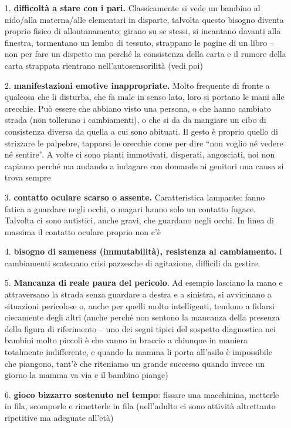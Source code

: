 \begin{itemize}
\item[1.]
  \textbf{difficoltà a stare con i pari.} Classicamente si vede un
  bambino al nido/alla materna/alle elementari in disparte, talvolta
  questo bisogno diventa proprio fisico di allontanamento; girano su se
  stessi, si incantano davanti alla finestra, tormentano un lembo di
  tessuto, strappano le pagine di un libro -- non per fare un dispetto
  ma perché la consistenza della carta e il rumore della carta strappata
  rientrano nell'autosensorilità (vedi poi)
\item[2.]
  \textbf{manifestazioni emotive inappropriate.} Molto frequente di
  fronte a qualcosa che li disturba, che fa male in senso lato, loro si
  portano le mani alle orecchie. Può essere che abbiano visto una
  persona, o che hanno cambiato strada (non tollerano i cambiamenti), o
  che si da da mangiare un cibo di consistenza diversa da quella a cui
  sono abituati. Il gesto è proprio quello di strizzare le palpebre,
  tapparsi le orecchie come per dire ``non voglio né vedere né
  sentire''. A volte ci sono pianti immotivati, disperati, angosciati,
  noi non capiamo perché ma andando a indagare con domande ai genitori
  una causa si trova sempre
\item[3.]
  \textbf{contatto oculare scarso o assente.} Caratteristica lampante:
  fanno fatica a guardare negli occhi, o magari hanno solo un contatto
  fugace. Talvolta ci sono autistici, anche gravi, che guardano negli
  occhi. In linea di massima il contatto oculare proprio non c'è
\item[4.]
  \textbf{bisogno di sameness (immutabilità), resistenza al
  cambiamento.} I cambiamenti scatenano crisi pazzesche di agitazione,
  difficili da gestire.
\item[5.]
  \textbf{Mancanza di reale paura del pericolo}. Ad esempio lasciano la
  mano e attraversano la strada senza guardare a destra e a sinistra, si
  avvicinano a situazioni pericolose o, anche per quelli molto
  intelligenti, tendono a fidarsi ciecamente degli altri (anche perché
  non sentono la mancanza della presenza della figura di riferimento --
  uno dei segni tipici del sospetto diagnostico nei bambini molto
  piccoli è che vanno in braccio a chiunque in maniera totalmente
  indifferente, e quando la mamma li porta all'asilo è impossibile che
  piangono, tant'è che riteniamo un grande successo quando invece un
  giorno la mamma va via e il bambino piange)
\item[6.]
  \textbf{gioco bizzarro sostenuto nel tempo}: fissare una macchinina,
  metterle in fila, scomporle e rimetterle in fila (nell'adulto ci sono
  attività altrettanto ripetitive ma adeguate all'età)
\end{itemize}


